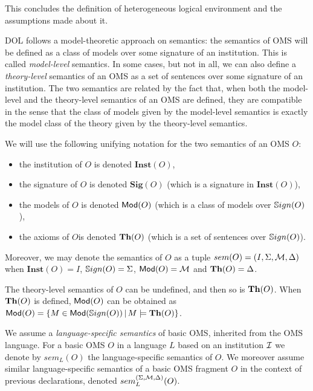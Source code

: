 \documentclass[10pt,fleqn,%
\ifpretendfinal
final%
\else
draft%
\fi,
]{scrreprt}
\newcommand{\Sig}{\mathbf{Sig}}
\newcommand{\Inst}{\ensuremath{\mathbf{Inst}}}
\begin{document}
This concludes the definition of heterogeneous logical environment and the assumptions made about it.

\medskip



DOL follows a model-theoretic approach on semantics: the semantics of OMS will be defined as a class of models 
over some signature of an institution. This is called \emph{model-level}  semantics. In some cases, but not in all, we can also define
a \emph{theory-level} semantics of an OMS as a set of sentences over some signature of an institution. The two semantics are 
related by the fact that, when both the model-level and the theory-level semantics of an OMS are defined, they are compatible in the 
sense that the class of models given by the model-level semantics is exactly the model class of the theory given by the
theory-level semantics. 

We will use the following unifying notation for the two semantics of an OMS $O$: 
\begin{itemize}
 \item the institution of $O$ is denoted $\Inst(O)$,
  \item the signature of $O$ is denoted $\Sig(O)$ (which is a signature in $\Inst(O)$),
  \item the models of $O$ is denoted $\mathsf{Mod}(O)$ (which is a class of models over $\mathbb{S}ign(O)$),
  \item the axioms of $O$is denoted $\mathbf{Th}(O)$ (which is a set of sentences over $\mathbb{S}ign(O)$).
\end{itemize}
\noindent Moreover, we may denote the semantics of $O$ as a tuple $sem(O) = (I, \Sigma, {\cal M},\Delta)$
when $\Inst(O) = I$, $\mathbb{S}ign(O) = \Sigma$, $\mathsf{Mod}(O) = {\cal M}$ and $\mathbf{Th}(O) = \Delta$.

The theory-level semantics of $O$ can be undefined, and then so is $\mathbf{Th}(O)$. When $\mathbf{Th}(O)$ is defined, $\mathsf{Mod}(O)$ can be obtained as $\mathsf{Mod}(O)=\{M\in\mathsf{Mod}(\mathbb{S}ign(O)) \,|\, M\models\mathbf{Th}(O)\}$.

We assume a \emph{language-specific semantics} of basic 
OMS, inherited from the OMS language. For a basic OMS $O$ in a
language $L$ based on an institution ${\mathcal{I}}$ we denote 
by $sem_L(O)$ the language-specific semantics of $O$.
We moreover assume similar language-specific semantics of a basic OMS fragment $O$ in
the context of previous declarations, denoted $sem^{(\Sigma,{\cal M},\Delta)}_L(O)$.
\end{document}
